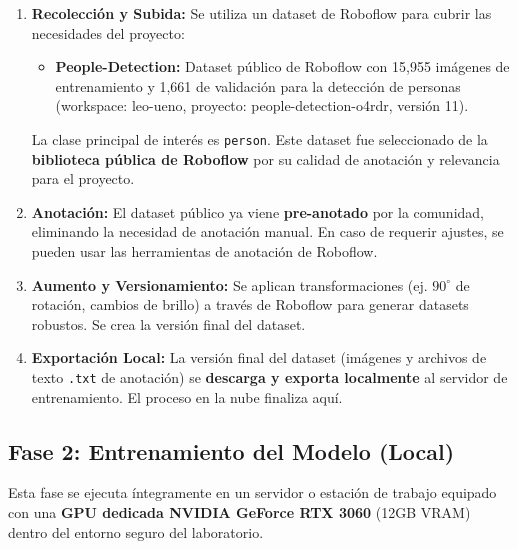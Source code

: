 \documentclass[12pt, a4paper]{article}
\begin{document}
\begin{enumerate}
\item \textbf{Recolección y Subida:} Se utiliza un dataset de Roboflow para cubrir las necesidades del proyecto:
\begin{itemize}
\item \textbf{People-Detection:} Dataset público de Roboflow con 15,955 imágenes de entrenamiento y 1,661 de validación para la detección de personas (workspace: leo-ueno, proyecto: people-detection-o4rdr, versión 11).
\end{itemize}
La clase principal de interés es \texttt{person}. Este dataset fue seleccionado de la \textbf{biblioteca pública de Roboflow} por su calidad de anotación y relevancia para el proyecto.
\item \textbf{Anotación:} El dataset público ya viene \textbf{pre-anotado} por la comunidad, eliminando la necesidad de anotación manual. En caso de requerir ajustes, se pueden usar las herramientas de anotación de Roboflow.
\item \textbf{Aumento y Versionamiento:} Se aplican transformaciones (ej. $90^{\circ}$ de rotación, cambios de brillo) a través de Roboflow para generar datasets robustos. Se crea la versión final del dataset.
\item \textbf{Exportación Local:} La versión final del dataset (imágenes y archivos de texto \texttt{.txt} de anotación) se \textbf{descarga y exporta localmente} al servidor de entrenamiento. El proceso en la nube finaliza aquí.
\end{enumerate}

\subsection{Fase 2: Entrenamiento del Modelo (Local)}

Esta fase se ejecuta íntegramente en un servidor o estación de trabajo equipado con una \textbf{GPU dedicada NVIDIA GeForce RTX 3060} (12GB VRAM) dentro del entorno seguro del laboratorio.
\end{document}
